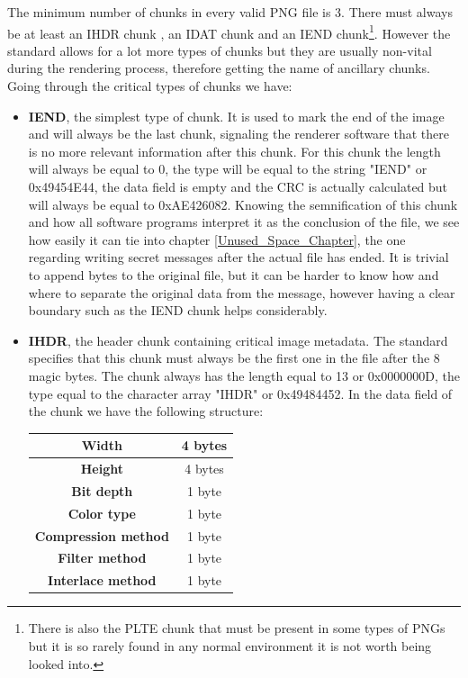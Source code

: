 The minimum number of chunks in every valid PNG file is 3. There must always be at least an IHDR chunk , an IDAT chunk and an IEND chunk\footnote{There is also the PLTE chunk that must be present in some types of PNGs but it is so rarely found in any normal environment it is not worth being looked into.}. However the standard allows for a lot more types of chunks but they are usually non-vital during the rendering process, therefore getting the name of ancillary chunks. Going through the critical types of chunks we have:
\begin{itemize}
	\item \textbf{IEND}, the simplest type of chunk. It is used to mark the end of the image and will always be the last chunk, signaling the renderer software that there is no more relevant information after this chunk. For this chunk the length will always be equal to 0, the type will be equal to the string "IEND" or 0x49454E44, the data field is empty and the CRC is actually calculated but will always be equal to 0xAE426082. Knowing the semnification of this chunk and how all software programs interpret it as the conclusion of the file, we see how easily it can tie into chapter \ref{Unused_Space_Chapter}, the one regarding writing secret messages after the actual file has ended. It is trivial to append bytes to the original file, but it can be harder to know how and where to separate the original data from the message, however having a clear boundary such as the IEND chunk helps considerably.
	\item \textbf{IHDR}, the header chunk containing critical image metadata. The standard specifies that this chunk must always be the first one in the file after the 8 magic bytes. The chunk always has the length equal to 13 or 0x0000000D, the type equal to the character array "IHDR" or 0x49484452. In the data field of the chunk we have the following structure:
\begin{center}
\begin{tabular}{|c|c|}
\hline
\textbf{Width} & 4 bytes \\ \hline
\textbf{Height} & 4 bytes \\ \hline
\textbf{Bit depth} & 1 byte \\ \hline
\textbf{Color type} & 1 byte \\ \hline
\textbf{Compression method} & 1 byte \\ \hline
\textbf{Filter method} & 1 byte \\ \hline
\textbf{Interlace method} & 1 byte \\ \hline

\end{tabular}
\end{center}
\end{itemize}
